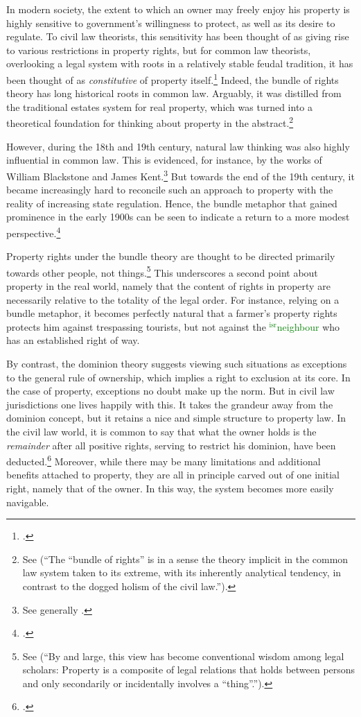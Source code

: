 \documentclass[12pt,a4paper]{book} %
\newcommand{\isr}[1]{\textcolor{green}{$^{\textrm{isr}}${#1}}}
\begin{document}
In modern society, the extent to which an owner may freely enjoy his property is highly sensitive to government's willingness to protect, as well as its desire to regulate. To civil law theorists, this sensitivity has been thought of as giving rise to various restrictions in property rights, but for common law theorists, overlooking a legal system with roots in a relatively stable feudal tradition, it has been thought of as {\it constitutive} of property itself.\footcite[7]{chang12} Indeed, the bundle of rights theory has long historical roots in common law. Arguably, it was distilled from the traditional estates system for real property, which was turned into a theoretical foundation for thinking about property in the abstract.\footnote{See \cite[7]{chang12}   
(``The ``bundle of rights'' is in a sense the theory implicit in the common law system taken to its extreme, with its inherently analytical tendency, in contrast to the dogged holism of the civil law.'').} 

However, during the 18th and 19th century, natural law thinking was also highly influential in common law. This is evidenced, for instance, by the works of William Blackstone and James Kent.\footnote{See generally \cite{blackstone79b,kent27}.} But towards the end of the 19th century, it became increasingly hard to reconcile such an approach to property with the reality of increasing state regulation. Hence, the bundle metaphor that gained prominence in the early 1900s can be seen to indicate a return to a more modest perspective.\footcite[195]{klein11}

Property rights under the bundle theory are thought to be directed primarily towards other people, not things.\footnote{See \cite[357-358]{merrill01} (``By and large, this view has become conventional wisdom among legal scholars: Property is a composite of legal relations that holds between persons and only secondarily or incidentally involves a ``thing''.'').} This underscores a second point about property in the real world, namely that the content of rights in property are necessarily relative to the totality of the legal order. For instance, relying on a bundle metaphor, it becomes perfectly natural that a farmer's property rights protects him against trespassing tourists, but not against the \isr{neighbour} who has an established right of way. 

By contrast, the dominion theory suggests viewing such situations as exceptions to the general rule of ownership, which implies a right to exclusion at its core. In the case of property, exceptions no doubt make up the norm. But in civil law jurisdictions one lives happily with this. It takes the grandeur away from the dominion concept, but it retains a nice and simple structure to property law. In the civil law world, it is common to say that what the owner holds is the {\it remainder} after all positive rights, serving to restrict his dominion, have been deducted.\footcite[25]{chang12} Moreover, while there may be many limitations and additional benefits attached to property, they are all in principle carved out of one initial right, namely that of the owner. In this way, the system becomes more easily navigable.
\end{document}
